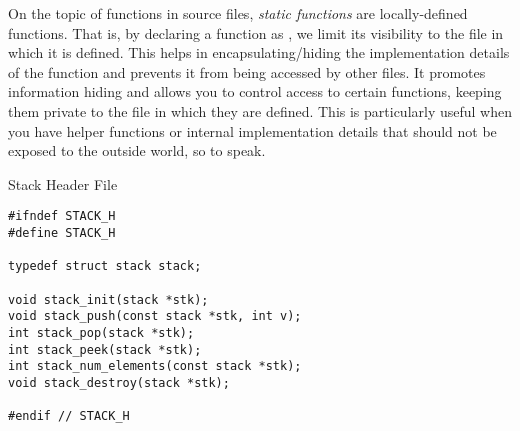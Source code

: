 On the topic of functions in source files, \textit{static functions} are locally-defined functions. That is, by declaring a function as , we limit its visibility to the file in which it is defined. This helps in encapsulating/hiding the implementation details of the function and prevents it from being accessed by other files. It promotes information hiding and allows you to control access to certain functions, keeping them private to the file in which they are defined. This is particularly useful when you have helper functions or internal implementation details that should not be exposed to the outside world, so to speak.


\begin{cl}[stack.h]{Stack Header File}
\begin{lstlisting}[language=MyC]
#ifndef STACK_H
#define STACK_H

typedef struct stack stack;

void stack_init(stack *stk);
void stack_push(const stack *stk, int v);
int stack_pop(stack *stk);
int stack_peek(stack *stk);
int stack_num_elements(const stack *stk);
void stack_destroy(stack *stk);

#endif // STACK_H
\end{lstlisting}
\end{cl}

